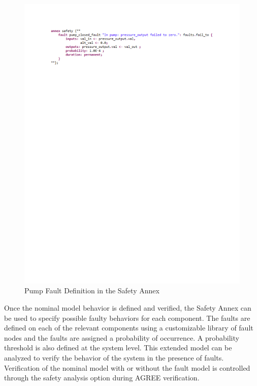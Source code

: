 \begin{figure}[!ht]
	\vspace{-0.6in}
	\begin{center}
		\includegraphics[trim=30 635 0 30,clip,width=1.0\dimexpr\textwidth-1.5cm\relax]{images/pump_fault.pdf}
		\caption{Pump Fault Definition in the Safety Annex}
		\label{fig:fault_pump}
	\end{center}
\end{figure}

Once the nominal model behavior is defined and verified, the Safety Annex can be used to specify possible faulty behaviors for each component. The faults are defined on each of the relevant components using a customizable library of fault nodes and the faults are assigned a probability of occurrence. A probability threshold is also defined at the system level. This extended model can be analyzed to verify the behavior of the system in the presence of faults. Verification of the nominal model with or without the fault model is controlled through the safety analysis option during AGREE verification.

